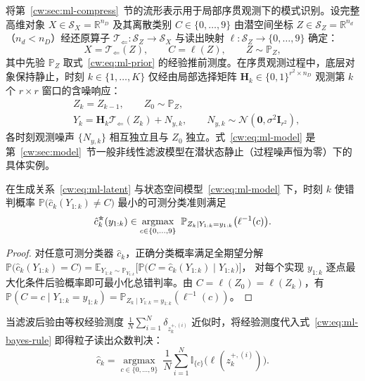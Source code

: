 将第~\ref{cw:sec:ml-compress}~节的流形表示用于局部序贯观测下的模式识别。设完整高维对象 $X\in\mathcal S_X=\mathbb R^{n_D}$ 及其离散类别 $C\in\{0,\dots,9\}$ 由潜空间坐标 $Z\in\mathcal S_Z=\mathbb R^{n_d}$（$n_d<n_D$）经还原算子 $\mathscr T_{\Leftarrow}:\mathcal S_Z\to\mathcal S_X$ 与读出映射 $\ell:\mathcal S_Z\to\{0,\dots,9\}$ 确定：
\begin{equation}\label{cw:eq:ml-latent}
X=\mathscr T_{\Leftarrow}(Z),\qquad C=\ell(Z),\qquad Z\sim\mathbb P_Z,
\end{equation}
其中先验 $\mathbb P_Z$ 取式~\eqref{cw:eq:ml-prior} 的经验推前测度。在序贯观测过程中，底层对象保持静止，时刻 $k\in\{1,\dots,K\}$ 仅经由局部选择矩阵 $\bm H_k\in\{0,1\}^{r^2\times n_D}$ 观测第 $k$ 个 $r\times r$ 窗口的含噪响应：
\begin{equation}\label{cw:eq:ml-model}
\begin{aligned}
&Z_k=Z_{k-1},\qquad Z_0\sim\mathbb P_Z,\\
&Y_k=\bm H_k\mathscr T_{\Leftarrow}(Z_k)+N_{y,k},\qquad N_{y,k}\sim\mathcal N(\bm 0,\sigma^2\bm I_{r^2}),
\end{aligned}
\end{equation}
各时刻观测噪声 $\{N_{y,k}\}$ 相互独立且与 $Z_0$ 独立。式~\eqref{cw:eq:ml-model} 是第~\ref{cw:sec:model}~节一般非线性滤波模型在潜状态静止（过程噪声恒为零）下的具体实例。

\begin{proposition}[序贯识别的最优后验准则]\label{cw:lem:ml-bayes-rule}
在生成关系~\eqref{cw:eq:ml-latent} 与状态空间模型~\eqref{cw:eq:ml-model} 下，时刻 $k$ 使错判概率 $\mathbb P\bigl(\hat c_k(Y_{1:k})\neq C\bigr)$ 最小的可测分类准则满足
\begin{equation}\label{cw:eq:ml-bayes-rule}
\hat c_k^{\optstar}(y_{1:k})\in\operatorname*{argmax}_{c\in\{0,\dots,9\}}\
\mathbb P_{Z_k\mid Y_{1:k}=y_{1:k}}\bigl(\ell^{-1}(c)\bigr).
\end{equation}
\end{proposition}
\begin{proof}
对任意可测分类器 $\hat c_k$，正确分类概率满足全期望分解
$\mathbb P\bigl(\hat c_k(Y_{1:k})=C\bigr)=\mathbb E_{Y_{1:k}\sim\mathbb P_{Y_{1:k}}}\bigl[\mathbb P\bigl(C=\hat c_k(Y_{1:k})\mid Y_{1:k}\bigr)\bigr]$，
对每个实现 $y_{1:k}$ 逐点最大化条件后验概率即可最小化总错判率。由 $C=\ell(Z_0)=\ell(Z_k)$，有 $\mathbb P(C=c\mid Y_{1:k}=y_{1:k})=\mathbb P_{Z_k\mid Y_{1:k}=y_{1:k}}(\ell^{-1}(c))$。
\end{proof}

当滤波后验由等权经验测度 $\frac1N\sum_{i=1}^N\delta_{z_k^{+,(i)}}$ 近似时，将经验测度代入式~\eqref{cw:eq:ml-bayes-rule} 即得粒子读出众数判决：
\begin{equation}\label{cw:eq:ml-vote}
\hat c_k=\operatorname*{argmax}_{c\in\{0,\dots,9\}}\ \frac1N\sum_{i=1}^N\mathbb I_{\{c\}}\bigl(\ell(z_k^{+,(i)})\bigr).
\end{equation}

